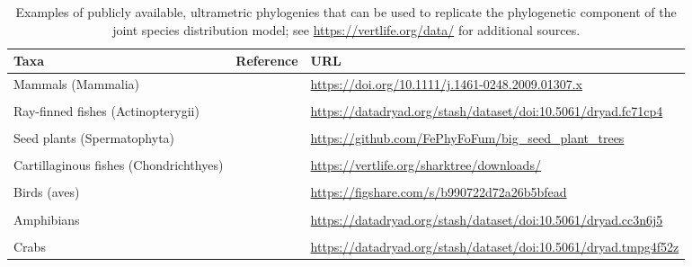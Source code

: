 \lstset{style=Rcode}


\begin{table}
  \caption[List of public ultrametric phylogenies]{Examples of publicly available, ultrametric phylogenies that can be used to replicate the phylogenetic component of the joint species distribution model;  see \url{https://vertlife.org/data/} for additional sources.}
\begin{center}
\begin{tabularx}{\textwidth}{ | X m{0.5in} m{3in} | } 
  \hline
  Taxa & Reference & URL \\ 
  \hline

  Mammals (Mammalia) & \cite{fritz_geographical_2009} & \url{https://doi.org/10.1111/j.1461-0248.2009.01307.x} \\ & & \\ 
  
  Ray-finned fishes (Actinopterygii) & \cite{rabosky_inverse_2018} & \url{https://datadryad.org/stash/dataset/doi:10.5061/dryad.fc71cp4} \\ & & \\ 
  
  Seed plants (Spermatophyta) & \cite{smith_constructing_2018} & \url{https://github.com/FePhyFoFum/big_seed_plant_trees} \\ & & \\ 
  
  Cartillaginous fishes (Chondrichthyes) & \cite{stein_global_2018} & \url{https://vertlife.org/sharktree/downloads/} \\ & & \\
  
  Birds (aves) & \cite{tobias_avonet_2022} & \url{https://figshare.com/s/b990722d72a26b5bfead} \\ & & \\

  Amphibians & \cite{jetz_interplay_2018} & \url{https://datadryad.org/stash/dataset/doi:10.5061/dryad.cc3n6j5} \\ & & \\

  Crabs & \cite{wolfe_convergent_2022} & \url{https://datadryad.org/stash/dataset/doi:10.5061/dryad.tmpg4f52z} \\

  \hline
\end{tabularx}
  \label{tab:Chap11_phylogenies}
\end{center}
\end{table}

